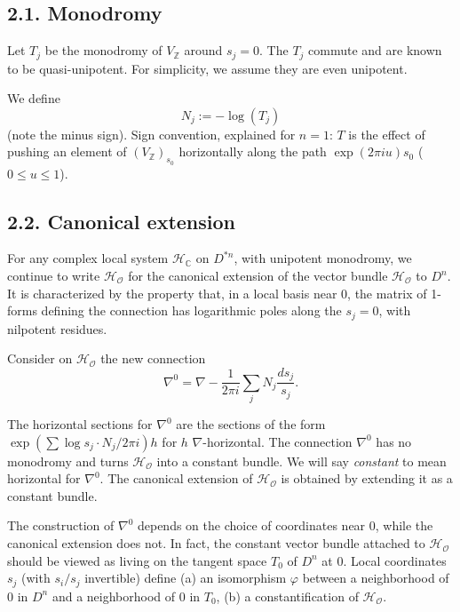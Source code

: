 \documentclass[11pt,a4paper]{article}
\theoremstyle{plain}
\theoremstyle{definition}
\begin{document}
\subsection{2.1. Monodromy}

Let $T_{j}$ be the monodromy of $V_{\mathbb{Z}}$ around $s_{j} = 0$. The $T_{j}$ commute and are known to be quasi-unipotent. For simplicity, we assume they are even unipotent.

We define
\[
N_{j} := -\log(T_{j})
\]
(note the minus sign). Sign convention, explained for $n = 1$: $T$ is the effect of pushing an element of $(V_{\mathbb{Z}})_{s_{0}}$ horizontally along the path $\exp(2\pi i u)s_{0}$ ($0 \leq u \leq 1$).

\subsection{2.2. Canonical extension}

For any complex local system $\mathcal{H}_{\mathbb{C}}$ on $D^{*n}$, with unipotent monodromy, we continue to write $\mathcal{H}_{\mathcal{O}}$ for the canonical extension of the vector bundle $\mathcal{H}_{\mathcal{O}}$ to $D^{n}$. It is characterized by the property that, in a local basis near 0, the matrix of 1-forms defining the connection has logarithmic poles along the $s_{j} = 0$, with nilpotent residues.

Consider on $\mathcal{H}_{\mathcal{O}}$ the new connection
\begin{equation}
\nabla^{0} = \nabla - \frac{1}{2\pi i}\sum_{j} N_{j}\frac{ds_{j}}{s_{j}}. \tag{2.2.1}
\end{equation}

The horizontal sections for $\nabla^{0}$ are the sections of the form $\exp(\sum \log s_{j} \cdot N_{j}/2\pi i)h$ for $h$ $\nabla$-horizontal. The connection $\nabla^{0}$ has no monodromy and turns $\mathcal{H}_{\mathcal{O}}$ into a constant bundle. We will say \emph{constant} to mean horizontal for $\nabla^{0}$. The canonical extension of $\mathcal{H}_{\mathcal{O}}$ is obtained by extending it as a constant bundle.

The construction of $\nabla^{0}$ depends on the choice of coordinates near 0, while the canonical extension does not. In fact, the constant vector bundle attached to $\mathcal{H}_{\mathcal{O}}$ should be viewed as living on the tangent space $T_{0}$ of $D^{n}$ at 0. Local coordinates $s_{j}$ (with $s_{i}/s_{j}$ invertible) define (a) an isomorphism $\varphi$ between a neighborhood of 0 in $D^{n}$ and a neighborhood of 0 in $T_{0}$, (b) a constantification of $\mathcal{H}_{\mathcal{O}}$.
\end{document}
